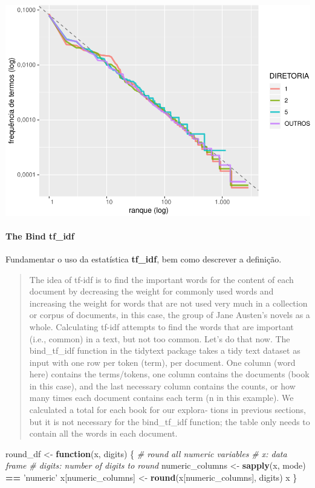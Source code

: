 \documentclass[]{article}
\newenvironment{Shaded}{\begin{snugshade}}{\end{snugshade}}
\newcommand{\CommentTok}[1]{\textcolor[rgb]{0.56,0.35,0.01}{\textit{#1}}}
\newcommand{\ControlFlowTok}[1]{\textcolor[rgb]{0.13,0.29,0.53}{\textbf{#1}}}
\newcommand{\KeywordTok}[1]{\textcolor[rgb]{0.13,0.29,0.53}{\textbf{#1}}}
\newcommand{\NormalTok}[1]{#1}
\newcommand{\OperatorTok}[1]{\textcolor[rgb]{0.81,0.36,0.00}{\textbf{#1}}}
\newcommand{\StringTok}[1]{\textcolor[rgb]{0.31,0.60,0.02}{#1}}
\let\oldparagraph\paragraph
\renewcommand{\paragraph}[1]{\oldparagraph{#1}\mbox{}}
\begin{document}
\includegraphics{markdown_v50_files/figure-latex/unnamed-chunk-41-1.pdf}

\hypertarget{the-bind-tf_idf}{%
\paragraph{\texorpdfstring{The Bind
\textbf{tf\_idf}}{The Bind tf\_idf}}\label{the-bind-tf_idf}}

Fundamentar o uso da estatística \textbf{tf\_idf}, bem como descrever a
definição.

\begin{quote}
The idea of tf-idf is to find the important words for the content of
each document by decreasing the weight for commonly used words and
increasing the weight for words that are not used very much in a
collection or corpus of documents, in this case, the group of Jane
Austen's novels as a whole. Calculating tf-idf attempts to find the
words that are important (i.e., common) in a text, but not too common.
Let's do that now. The bind\_tf\_idf function in the tidytext package
takes a tidy text dataset as input with one row per token (term), per
document. One column (word here) contains the terms/tokens, one column
contains the documents (book in this case), and the last necessary
column contains the counts, or how many times each document contains
each term (n in this example). We calculated a total for each book for
our explora‐ tions in previous sections, but it is not necessary for the
bind\_tf\_idf function; the table only needs to contain all the words in
each document.
\end{quote}

\begin{Shaded}
\begin{Highlighting}[]
\NormalTok{round_df <-}\StringTok{ }\ControlFlowTok{function}\NormalTok{(x, digits) \{}
    \CommentTok{# round all numeric variables}
    \CommentTok{# x: data frame }
    \CommentTok{# digits: number of digits to round}
\NormalTok{    numeric_columns <-}\StringTok{ }\KeywordTok{sapply}\NormalTok{(x, mode) }\OperatorTok{==}\StringTok{ 'numeric'}
\NormalTok{    x[numeric_columns] <-}\StringTok{  }\KeywordTok{round}\NormalTok{(x[numeric_columns], digits)}
\NormalTok{    x}
\NormalTok{\}}
\end{Highlighting}
\end{Shaded}
\end{document}
